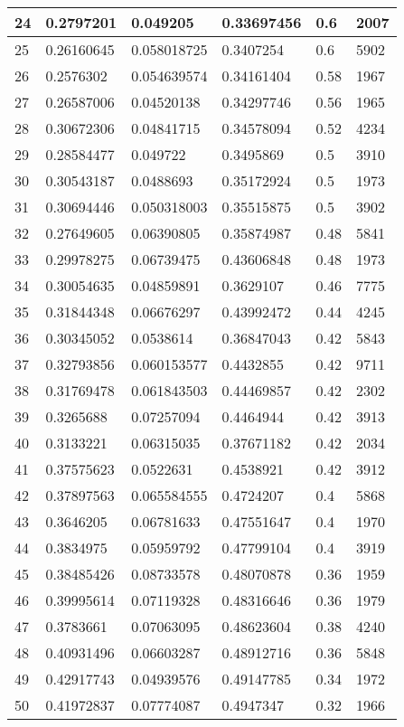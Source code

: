 \begin{longtable}{|l|l|l|l|l|l|}
24 & 0.2797201 & 0.049205 & 0.33697456 & 0.6 & 2007 \\ \hline 
25 & 0.26160645 & 0.058018725 & 0.3407254 & 0.6 & 5902 \\ \hline 
26 & 0.2576302 & 0.054639574 & 0.34161404 & 0.58 & 1967 \\ \hline 
27 & 0.26587006 & 0.04520138 & 0.34297746 & 0.56 & 1965 \\ \hline 
28 & 0.30672306 & 0.04841715 & 0.34578094 & 0.52 & 4234 \\ \hline 
29 & 0.28584477 & 0.049722 & 0.3495869 & 0.5 & 3910 \\ \hline 
30 & 0.30543187 & 0.0488693 & 0.35172924 & 0.5 & 1973 \\ \hline 
31 & 0.30694446 & 0.050318003 & 0.35515875 & 0.5 & 3902 \\ \hline 
32 & 0.27649605 & 0.06390805 & 0.35874987 & 0.48 & 5841 \\ \hline 
33 & 0.29978275 & 0.06739475 & 0.43606848 & 0.48 & 1973 \\ \hline 
34 & 0.30054635 & 0.04859891 & 0.3629107 & 0.46 & 7775 \\ \hline 
35 & 0.31844348 & 0.06676297 & 0.43992472 & 0.44 & 4245 \\ \hline 
36 & 0.30345052 & 0.0538614 & 0.36847043 & 0.42 & 5843 \\ \hline 
37 & 0.32793856 & 0.060153577 & 0.4432855 & 0.42 & 9711 \\ \hline 
38 & 0.31769478 & 0.061843503 & 0.44469857 & 0.42 & 2302 \\ \hline 
39 & 0.3265688 & 0.07257094 & 0.4464944 & 0.42 & 3913 \\ \hline 
40 & 0.3133221 & 0.06315035 & 0.37671182 & 0.42 & 2034 \\ \hline 
41 & 0.37575623 & 0.0522631 & 0.4538921 & 0.42 & 3912 \\ \hline 
42 & 0.37897563 & 0.065584555 & 0.4724207 & 0.4 & 5868 \\ \hline 
43 & 0.3646205 & 0.06781633 & 0.47551647 & 0.4 & 1970 \\ \hline 
44 & 0.3834975 & 0.05959792 & 0.47799104 & 0.4 & 3919 \\ \hline 
45 & 0.38485426 & 0.08733578 & 0.48070878 & 0.36 & 1959 \\ \hline 
46 & 0.39995614 & 0.07119328 & 0.48316646 & 0.36 & 1979 \\ \hline 
47 & 0.3783661 & 0.07063095 & 0.48623604 & 0.38 & 4240 \\ \hline 
48 & 0.40931496 & 0.06603287 & 0.48912716 & 0.36 & 5848 \\ \hline 
49 & 0.42917743 & 0.04939576 & 0.49147785 & 0.34 & 1972 \\ \hline 
50 & 0.41972837 & 0.07774087 & 0.4947347 & 0.32 & 1966 \\ \hline 
\end{longtable}